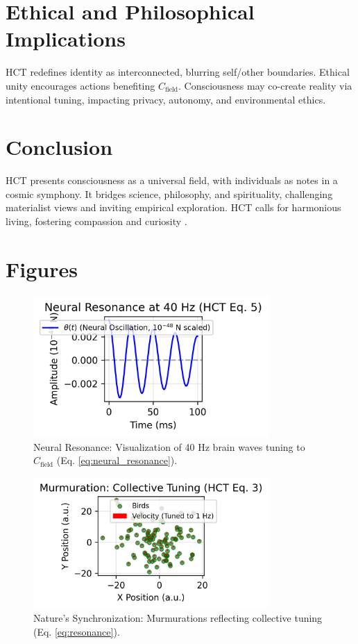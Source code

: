 \documentclass[a4paper,12pt]{article}
\begin{document}
\section{Ethical and Philosophical Implications}
\label{sec:ethics}
HCT redefines identity as interconnected, blurring self/other boundaries. Ethical unity encourages actions benefiting $C_{\text{field}}$. Consciousness may co-create reality via intentional tuning, impacting privacy, autonomy, and environmental ethics.

\section{Conclusion}
\label{sec:conclusion}
HCT presents consciousness as a universal field, with individuals as notes in a cosmic symphony. It bridges science, philosophy, and spirituality, challenging materialist views and inviting empirical exploration. HCT calls for harmonious living, fostering compassion and curiosity \citep{Wright2025HCT}.

\section{Figures}
\label{sec:figures}

\begin{figure}[h]
    \centering
    \includegraphics[width=0.8\textwidth]{figures/neural_resonance.png}
    \caption{Neural Resonance: Visualization of 40 Hz brain waves tuning to $C_{\text{field}}$ (Eq. \ref{eq:neural_resonance}).}
    \label{fig:neural_resonance}
\end{figure}

\begin{figure}[h]
    \centering
    \includegraphics[width=0.8\textwidth]{figures/nature_sync.png}
    \caption{Nature’s Synchronization: Murmurations reflecting collective tuning (Eq. \ref{eq:resonance}).}
    \label{fig:nature_sync}
\end{figure}
\end{document}
